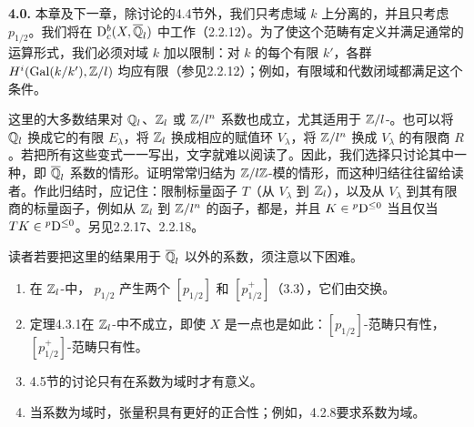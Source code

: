 \par\medskip\noindent\textbf{4.0.} 本章及下一章，除讨论的4.4节外，我们只考虑域 $k$ 上分离的，并且只考虑 $p_{1/2}$。我们将在 $\mathrm{D}_c^b(X,\overline{\mathbb Q}_l)$ 中工作（2.2.12）。为了使这个范畴有定义并满足通常的运算形式，我们必须对域 $k$ 加以限制：对 $k$ 的每个有限 $k'$，各群 $H^i(\operatorname{Gal}(\relax k/k'),\mathbb Z/l)$ 均应有限（参见2.2.12）；例如，有限域和代数闭域都满足这个条件。

这里的大多数结果对 $\mathbb Q_l$、$\mathbb Z_l$ 或 $\mathbb Z/l^n$ 系数也成立，尤其适用于 $\mathbb Z/l$-。也可以将 $\mathbb Q_l$ 换成它的有限 $E_\lambda$，将 $\mathbb Z_l$ 换成相应的赋值环 $V_\lambda$，将 $\mathbb Z/l^n$ 换成 $V_\lambda$ 的有限商 $R$。若把所有这些变式一一写出，文字就难以阅读了。因此，我们选择只讨论其中一种，即 $\overline{\mathbb Q}_l$ 系数的情形。证明常常归结为 $\mathbb Z/l\mathbb Z$-模的情形，而这种归结往往留给读者。作此归结时，应记住：限制标量函子 $T$（从 $V_\lambda$ 到 $\mathbb Z_l$），以及从 $V_\lambda$ 到其有限商的标量函子，例如从 $\mathbb Z_l$ 到 $\mathbb Z/l^n$ 的函子，都是，并且 $K\in{}^p\mathrm{D}^{\le0}$ 当且仅当 $TK\in{}^p\mathrm{D}^{\le0}$。另见2.2.17、2.2.18。

读者若要把这里的结果用于 $\overline{\mathbb Q}_l$ 以外的系数，须注意以下困难。
\begin{enumerate}[label=(\alph*)]
\item 在 $\mathbb Z_l$-中， $p_{1/2}$ 产生两个  $[p_{1/2}]$ 和 $[p_{1/2}^{+}]$（3.3），它们由交换。
\item 定理4.3.1在 $\mathbb Z_l$-中不成立，即使 $X$ 是一点也是如此：$[p_{1/2}]$-范畴只有性，$[p_{1/2}^{+}]$-范畴只有性。
\item 4.5节的讨论只有在系数为域时才有意义。
\item 当系数为域时，张量积具有更好的正合性；例如，4.2.8要求系数为域。
\end{enumerate}

